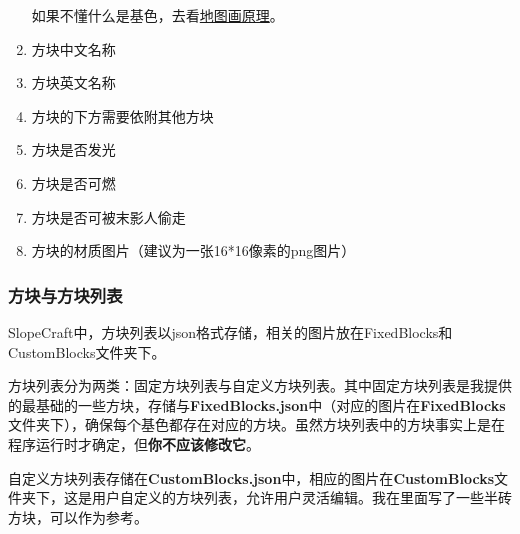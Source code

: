 \documentclass[UTF8]{ctexart}
\begin{document}
\begin{enumerate}
          如果不懂什么是基色，去看\href{https://github.com/ToKiNoBug/SlopeCraftTutorial/blob/main/BasicPrinciple/Principle%20of%20map%20pixel%20arts.md}{地图画原理}。
    \item 方块中文名称
    \item 方块英文名称
    \item 方块的下方需要依附其他方块
    \item 方块是否发光
    \item 方块是否可燃
    \item 方块是否可被末影人偷走
    \item 方块的材质图片（建议为一张16*16像素的png图片）
\end{enumerate}

\subsubsection{方块与方块列表}
SlopeCraft中，方块列表以json格式存储，相关的图片放在FixedBlocks和CustomBlocks文件夹下。

方块列表分为两类：固定方块列表与自定义方块列表。其中固定方块列表是我提供的最基础的一些方块，存储与\textbf{FixedBlocks.json}中（对应的图片在\textbf{FixedBlocks}文件夹下），确保每个基色都存在对应的方块。虽然方块列表中的方块事实上是在程序运行时才确定，但\textbf{你不应该修改它}。

自定义方块列表存储在\textbf{CustomBlocks.json}中，相应的图片在\textbf{CustomBlocks}文件夹下，这是用户自定义的方块列表，允许用户灵活编辑。我在里面写了一些半砖方块，可以作为参考。
\end{document}
